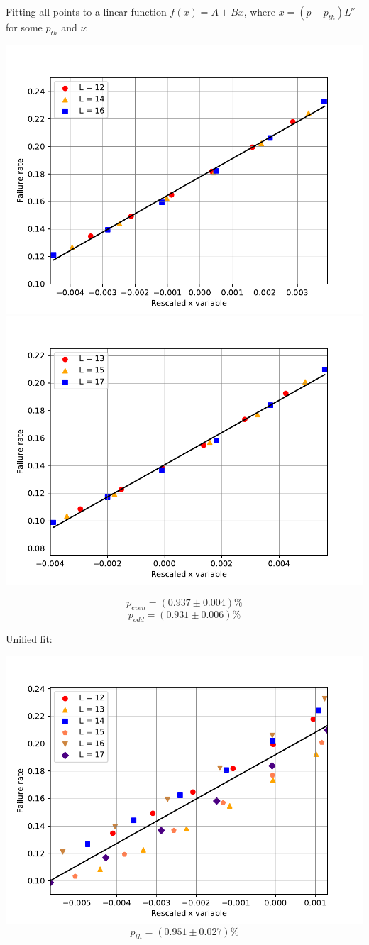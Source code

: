 \documentclass[pra]{revtex4-1}
\begin{document}
\noindent Fitting all points to a linear function $f(x) = A + Bx$, where $x=(p-p_{th})L^{\nu}$ for some $p_{th}$ and $\nu$: 
  
\includegraphics[width=.49\textwidth]{../graphs-paper2/hms-dephasing-even-rescaled.pdf}
\includegraphics[width=.49\textwidth]{../graphs-paper2/hms-dephasing-odd-rescaled.pdf}

\[  p_{even} = (0.937 \pm 0.004)\% \]
\[  p_{odd} = (0.931 \pm 0.006)\% \]
\clearpage 

Unified fit: \begin{center} 

\includegraphics[width=.9\textwidth]{../graphs-paper2/hms-dephasing-rescaled.pdf}
\[  p_{th} = (0.951 \pm 0.027)\% \] \end{center}
\clearpage 
\end{document}
